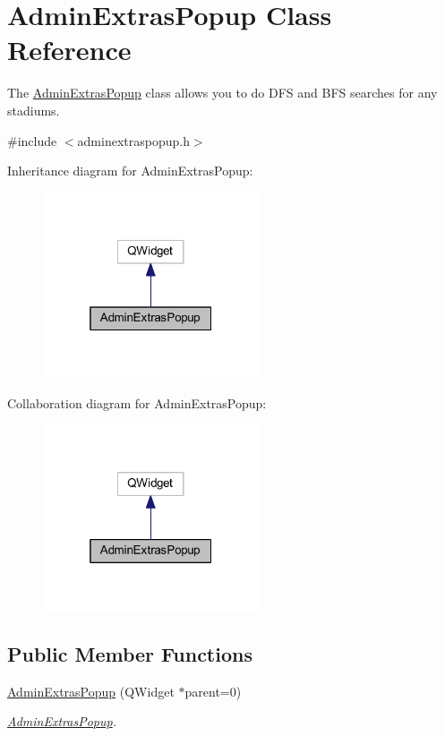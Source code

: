 \hypertarget{class_admin_extras_popup}{}\section{Admin\+Extras\+Popup Class Reference}
\label{class_admin_extras_popup}


The \hyperlink{class_admin_extras_popup}{Admin\+Extras\+Popup} class allows you to do D\+FS and B\+FS searches for any stadiums.  




{\ttfamily \#include $<$adminextraspopup.\+h$>$}



Inheritance diagram for Admin\+Extras\+Popup\+:
\nopagebreak
\begin{figure}[H]
\begin{center}
\leavevmode
\includegraphics[width=181pt]{class_admin_extras_popup__inherit__graph}
\end{center}
\end{figure}


Collaboration diagram for Admin\+Extras\+Popup\+:
\nopagebreak
\begin{figure}[H]
\begin{center}
\leavevmode
\includegraphics[width=181pt]{class_admin_extras_popup__coll__graph}
\end{center}
\end{figure}
\subsection*{Public Member Functions}
\begin{DoxyCompactItemize}
\item 
\hyperlink{class_admin_extras_popup_aabaeaaf01620c0152932fe79a4753964}{Admin\+Extras\+Popup} (Q\+Widget $\ast$parent=0)
\begin{DoxyCompactList}\small\item\em \hyperlink{class_admin_extras_popup}{Admin\+Extras\+Popup}. \end{DoxyCompactList}\end{DoxyCompactItemize}


